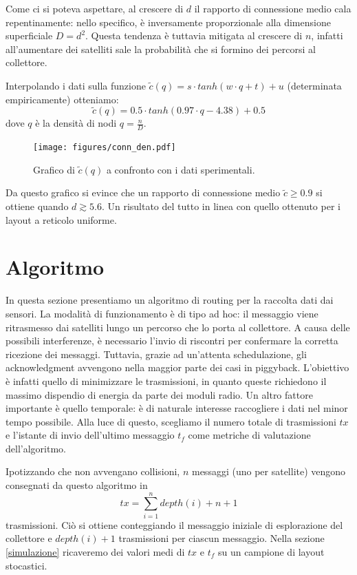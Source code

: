 \documentclass[a4paper,11pt]{article}
\theoremstyle{definition}
\begin{document}
Come ci si poteva aspettare, al crescere di $d$ il rapporto di connessione medio cala repentinamente: nello specifico, è inversamente proporzionale alla dimensione superficiale $D = d^2$. Questa tendenza è tuttavia mitigata al crescere di $n$, infatti all'aumentare dei satelliti sale la probabilità che si formino dei percorsi al collettore.

Interpolando i dati sulla funzione $\tilde{c}(q) = s \cdot tanh(w \cdot q + t) + u$ (determinata empiricamente) otteniamo:
\begin{equation*}
\tilde{c}(q) = 0.5 \cdot tanh(0.97 \cdot q - 4.38) + 0.5
\end{equation*}
dove $q$ è la densità di nodi $q = \frac{n}{D}$.

\begin{figure}[H]
\centering
\texttt{[image: figures/conn\_den.pdf]}
\caption{Grafico di $\tilde{c}(q)$ a confronto con i dati sperimentali.}
\end{figure}

Da questo grafico si evince che un rapporto di connessione medio $\tilde{c} \geq 0.9$ si ottiene quando $d \gtrsim 5.6$. Un risultato del tutto in linea con quello ottenuto per i layout a reticolo uniforme.

\section{Algoritmo}

In questa sezione presentiamo un algoritmo di routing per la raccolta dati dai sensori. La modalità di funzionamento è di tipo ad hoc: il messaggio viene ritrasmesso dai satelliti lungo un percorso che lo porta al collettore. A causa delle possibili interferenze, è necessario l'invio di riscontri per confermare la corretta ricezione dei messaggi. Tuttavia, grazie ad un'attenta schedulazione, gli acknowledgment avvengono nella maggior parte dei casi in piggyback. L'obiettivo è infatti quello di minimizzare le trasmissioni, in quanto queste richiedono il massimo dispendio di energia da parte dei moduli radio. Un altro fattore importante è quello temporale: è di naturale interesse raccogliere i dati nel minor tempo possibile. Alla luce di questo, scegliamo il numero totale di trasmissioni $tx$ e l'istante di invio dell'ultimo messaggio $t_f$ come metriche di valutazione dell'algoritmo.

Ipotizzando che non avvengano collisioni, $n$ messaggi (uno per satellite) vengono consegnati da questo algoritmo in
\begin{equation*}
tx = \sum_{i=1}^{n} depth(i) + n + 1
\end{equation*}
trasmissioni. Ciò si ottiene conteggiando il messaggio iniziale di esplorazione del collettore e $depth(i) + 1$ trasmissioni per ciascun messaggio. Nella sezione \ref{simulazione} ricaveremo dei valori medi di $tx$ e $t_f$ su un campione di layout stocastici.
\end{document}

